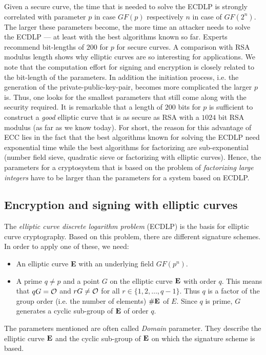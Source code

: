 Given a secure curve, the time that is needed to solve the ECDLP is strongly correlated with parameter $p$ in case $GF(p)$ respectively $n$ in case of $GF(2^n)$. The larger these parameters become, the more time an attacker needs to solve the ECDLP --- at least with the best algorithms known so far. Experts recommend bit-lengths of $200$ for $p$ for secure curves. A comparison with RSA modulus length shows why elliptic curves are so interesting for applications. We note that the computation effort for signing and encryption is closely related to the bit-length of the parameters. In addition the initiation process, i.e. the generation of the private-public-key-pair, becomes more complicated the larger $p$ is. Thus, one looks for the smallest parameters that still come along with the security required. It is remarkable that a length of $200$ bits for $p$ is sufficient to construct a {\em good} elliptic curve that is as secure as RSA with a $1024$ bit  RSA modulus (as far as we know today). For short, the reason for this advantage of ECC lies in the fact that the best algorithms known for solving the ECDLP need exponential time while the best algorithms for factorizing are sub-exponential (number field sieve, quadratic sieve or factorizing with elliptic curves). Hence, the parameters for a cryptosystem that is based on the problem of {\em factorizing large integers} have to be larger than the parameters for a system based on ECDLP.


\subsection{Encryption and signing with elliptic curves}

\begin{sloppypar}
  The {\em elliptic curve discrete logarithm
    problem} (ECDLP)  is the basis for elliptic curve cryptography. Based on this problem, there are different signature schemes. In order to apply one of these, we need:
\end{sloppypar}
\begin{itemize}
    \item An elliptic curve {\bf E} with an underlying field $GF(p^n)$.
    \item A prime $q\ne p$ and a point $G$ on the elliptic curve ${\bf E}$ with order $q$. This means that $qG={\cal O}$ and $rG\ne {\cal O}$ for all $r\in \{1,2,\dots,q-1\}$. Thus $q$ is a factor of the group order (i.e. the number of elements) $\#{\bf E}$ of $E$. Since $q$ is prime, $G$ generates a cyclic sub-group of ${\bf E}$ of order $q$.
\end{itemize}
The parameters mentioned are often called 
{\em Domain} parameter. They describe the elliptic curve ${\bf E}$ and 
the cyclic sub-group of ${\bf E}$ on which the signature scheme is based.

